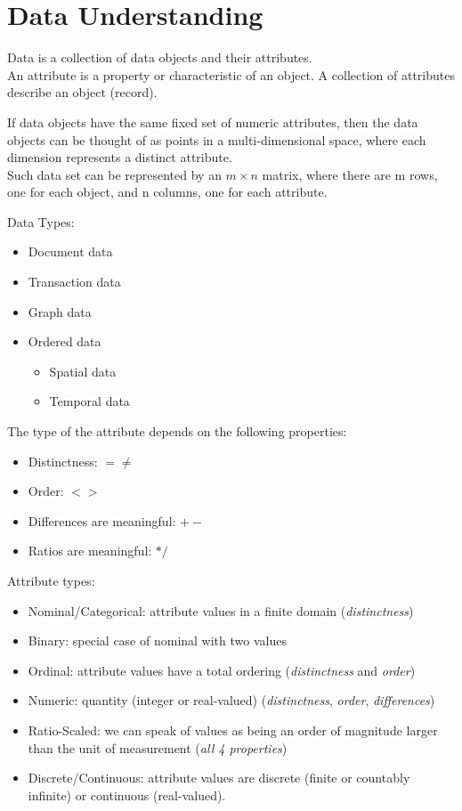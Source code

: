 \section{Data Understanding}

\begin{definition}
   [Data]
   Data is a collection of data objects and their attributes.\\
   An attribute is a property or
   characteristic of an object. 
   A collection of attributes
   describe an object (record).
\end{definition}

If data objects have the same fixed set of numeric attributes,
then the data objects can be thought of as points in a multi-dimensional space, where each dimension represents a distinct
attribute.\\
Such data set can be represented by an $m\times n$ matrix, where there are m rows, one for each object, and n columns, one for each attribute.

{Data Types:\ns
\begin{itemize}
   \item Document data
   \item Transaction data
   \item Graph data
   \item Ordered data
   \begin{itemize}
      \item Spatial data
      \item Temporal data
   \end{itemize}
\end{itemize}}

{The type of the attribute depends on the following properties:\ns
\begin{itemize}
   \item Distinctness: $= \neq$
   \item Order: $< >$
   \item Differences are meaningful: $+ -$
   \item Ratios are meaningful: $* /$
\end{itemize}}

{Attribute types:\ns
\begin{itemize}
   \item Nominal/Categorical: attribute values in a finite domain (\textit{distinctness})
   \item Binary: special case of nominal with two values
   \item Ordinal: attribute values have a total ordering (\textit{distinctness} and \textit{order})
   \item Numeric: quantity (integer or real-valued) (\textit{distinctness}, \textit{order}, \textit{differences})
   \item Ratio-Scaled: we can speak of values as being an order of magnitude larger than the unit of measurement (\textit{all 4 properties})
   \item Discrete/Continuous: attribute values are discrete (finite or countably infinite) or continuous (real-valued).
\end{itemize}}

